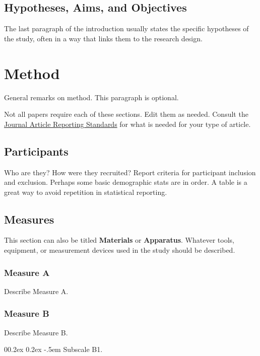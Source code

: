 \documentclass[
  jou,
  floatsintext,
  longtable,
  nolmodern,
  notxfonts,
  notimes,
  colorlinks=true,linkcolor=blue,citecolor=blue,urlcolor=blue]{apa7}
\makeatletter
\renewcommand{\paragraph}{\@startsection{paragraph}{4}{\parindent}%
	{0\baselineskip \@plus 0.2ex \@minus 0.2ex}%
	{-.5em}%
	{\normalfont\normalsize\bfseries\typesectitle}}
\makeatother
\begin{document}
\subsection{Hypotheses, Aims, and
Objectives}\label{hypotheses-aims-and-objectives}

The last paragraph of the introduction usually states the specific
hypotheses of the study, often in a way that links them to the research
design.

\section{Method}\label{method}

General remarks on method. This paragraph is optional.

Not all papers require each of these sections. Edit them as needed.
Consult the \href{https://apastyle.apa.org/jars}{Journal Article
Reporting Standards} for what is needed for your type of article.

\subsection{Participants}\label{participants}

Who are they? How were they recruited? Report criteria for participant
inclusion and exclusion. Perhaps some basic demographic stats are in
order. A table is a great way to avoid repetition in statistical
reporting.

\subsection{Measures}\label{measures}

This section can also be titled \textbf{Materials} or
\textbf{Apparatus}. Whatever tools, equipment, or measurement devices
used in the study should be described.

\subsubsection{Measure A}\label{measure-a}

Describe Measure A.

\subsubsection{Measure B}\label{measure-b}

Describe Measure B.

\paragraph{Subscale B1.}\label{subscale-b1}
\end{document}
